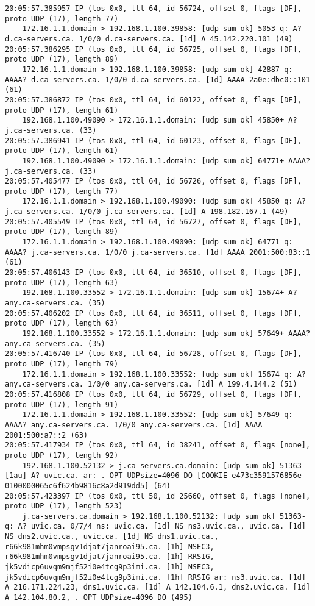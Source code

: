 \documentclass{article}
\begin{document}
{\begin{lstlisting}
20:05:57.385957 IP (tos 0x0, ttl 64, id 56724, offset 0, flags [DF], proto UDP (17), length 77)
    172.16.1.1.domain > 192.168.1.100.39858: [udp sum ok] 5053 q: A? d.ca-servers.ca. 1/0/0 d.ca-servers.ca. [1d] A 45.142.220.101 (49)
20:05:57.386295 IP (tos 0x0, ttl 64, id 56725, offset 0, flags [DF], proto UDP (17), length 89)
    172.16.1.1.domain > 192.168.1.100.39858: [udp sum ok] 42887 q: AAAA? d.ca-servers.ca. 1/0/0 d.ca-servers.ca. [1d] AAAA 2a0e:dbc0::101 (61)
20:05:57.386872 IP (tos 0x0, ttl 64, id 60122, offset 0, flags [DF], proto UDP (17), length 61)
    192.168.1.100.49090 > 172.16.1.1.domain: [udp sum ok] 45850+ A? j.ca-servers.ca. (33)
20:05:57.386941 IP (tos 0x0, ttl 64, id 60123, offset 0, flags [DF], proto UDP (17), length 61)
    192.168.1.100.49090 > 172.16.1.1.domain: [udp sum ok] 64771+ AAAA? j.ca-servers.ca. (33)
20:05:57.405477 IP (tos 0x0, ttl 64, id 56726, offset 0, flags [DF], proto UDP (17), length 77)
    172.16.1.1.domain > 192.168.1.100.49090: [udp sum ok] 45850 q: A? j.ca-servers.ca. 1/0/0 j.ca-servers.ca. [1d] A 198.182.167.1 (49)
20:05:57.405549 IP (tos 0x0, ttl 64, id 56727, offset 0, flags [DF], proto UDP (17), length 89)
    172.16.1.1.domain > 192.168.1.100.49090: [udp sum ok] 64771 q: AAAA? j.ca-servers.ca. 1/0/0 j.ca-servers.ca. [1d] AAAA 2001:500:83::1 (61)
20:05:57.406143 IP (tos 0x0, ttl 64, id 36510, offset 0, flags [DF], proto UDP (17), length 63)
    192.168.1.100.33552 > 172.16.1.1.domain: [udp sum ok] 15674+ A? any.ca-servers.ca. (35)
20:05:57.406202 IP (tos 0x0, ttl 64, id 36511, offset 0, flags [DF], proto UDP (17), length 63)
    192.168.1.100.33552 > 172.16.1.1.domain: [udp sum ok] 57649+ AAAA? any.ca-servers.ca. (35)
20:05:57.416740 IP (tos 0x0, ttl 64, id 56728, offset 0, flags [DF], proto UDP (17), length 79)
    172.16.1.1.domain > 192.168.1.100.33552: [udp sum ok] 15674 q: A? any.ca-servers.ca. 1/0/0 any.ca-servers.ca. [1d] A 199.4.144.2 (51)
20:05:57.416808 IP (tos 0x0, ttl 64, id 56729, offset 0, flags [DF], proto UDP (17), length 91)
    172.16.1.1.domain > 192.168.1.100.33552: [udp sum ok] 57649 q: AAAA? any.ca-servers.ca. 1/0/0 any.ca-servers.ca. [1d] AAAA 2001:500:a7::2 (63)
20:05:57.417934 IP (tos 0x0, ttl 64, id 38241, offset 0, flags [none], proto UDP (17), length 92)
    192.168.1.100.52132 > j.ca-servers.ca.domain: [udp sum ok] 51363 [1au] A? uvic.ca. ar: . OPT UDPsize=4096 DO [COOKIE e473c3591576856e 0100000065c6f624b9816c8a2d919dd5] (64)
20:05:57.423397 IP (tos 0x0, ttl 50, id 25660, offset 0, flags [none], proto UDP (17), length 523)
    j.ca-servers.ca.domain > 192.168.1.100.52132: [udp sum ok] 51363- q: A? uvic.ca. 0/7/4 ns: uvic.ca. [1d] NS ns3.uvic.ca., uvic.ca. [1d] NS dns2.uvic.ca., uvic.ca. [1d] NS dns1.uvic.ca., r66k981mhm0vmpsgv1djat7janroai95.ca. [1h] NSEC3, r66k981mhm0vmpsgv1djat7janroai95.ca. [1h] RRSIG, jk5vdicp6uvqm9mjf52i0e4tcg9p3imi.ca. [1h] NSEC3, jk5vdicp6uvqm9mjf52i0e4tcg9p3imi.ca. [1h] RRSIG ar: ns3.uvic.ca. [1d] A 216.171.224.23, dns1.uvic.ca. [1d] A 142.104.6.1, dns2.uvic.ca. [1d] A 142.104.80.2, . OPT UDPsize=4096 DO (495)

\end{lstlisting}}
\end{document}
